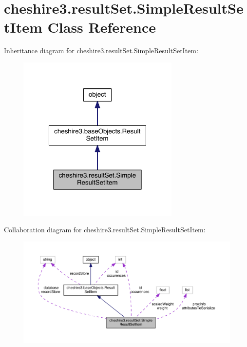 \hypertarget{classcheshire3_1_1result_set_1_1_simple_result_set_item}{\section{cheshire3.\-result\-Set.\-Simple\-Result\-Set\-Item Class Reference}
\label{classcheshire3_1_1result_set_1_1_simple_result_set_item}
}


Inheritance diagram for cheshire3.\-result\-Set.\-Simple\-Result\-Set\-Item\-:
\nopagebreak
\begin{figure}[H]
\begin{center}
\leavevmode
\includegraphics[width=228pt]{classcheshire3_1_1result_set_1_1_simple_result_set_item__inherit__graph}
\end{center}
\end{figure}


Collaboration diagram for cheshire3.\-result\-Set.\-Simple\-Result\-Set\-Item\-:
\nopagebreak
\begin{figure}[H]
\begin{center}
\leavevmode
\includegraphics[width=350pt]{classcheshire3_1_1result_set_1_1_simple_result_set_item__coll__graph}
\end{center}
\end{figure}
